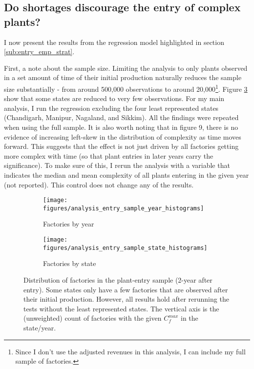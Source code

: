 \documentclass[11pt]{article}
\begin{document}
\newpage
\subsection{Do shortages discourage the entry of complex plants?}
\label{sub:longterm}
I now present the results from the regression model highlighted in section \ref{sub:entry_emp_strat}.

First, a note about the sample size. Limiting the analysis to only plants observed in a set amount of time of their initial production naturally reduces the sample size substantially - from around 500,000 observations to around 20,000\footnote{Since I don't use the adjusted revenues in this analysis, I can include my full sample of factories.}. Figure \ref{fig:new_entry_sample} show that some states are reduced to very few observations. For my main analysis, I run the regression excluding the four least represented states (Chandigarh, Manipur, Nagaland, and Sikkim). All the  findings were repeated when using the full sample. It is also worth noting that in figure 9, there is no evidence of increasing left-skew in the distribution of complexity as time moves forward. This suggests that the effect is not just driven by all factories getting more complex with time (so that plant entries in later years carry the significance). To make sure of this, I rerun the analysis with a variable that indicates the median and mean complexity of all plants entering in the given year (not reported). This control does not change any of the results.

\begin{figure}
     \centering
     \begin{subfigure}[b]{0.45\textwidth}
         \centering
         \texttt{[image: figures/analysis\_entry\_sample\_year\_histograms]}
	 \caption{Factories by year}
         \label{fig:entry_by_year}
     \end{subfigure}
     \hfill
     \begin{subfigure}[b]{0.45\textwidth}
         \centering
         \texttt{[image: figures/analysis\_entry\_sample\_state\_histograms]}
	 \caption{Factories by state}
         \label{fig:entry_by_state}
     \end{subfigure}
     \caption[Distribution of new factories by state and year]{Distribution of factories in the plant-entry sample (2-year after entry). Some states only have a few factories that are observed after their initial production. However, all results hold after rerunning the tests without the least represented states. The vertical axis is the (unweighted) count of factories with the given $C^{max}_{f}$ in the state/year.}
        \label{fig:new_entry_sample}
\end{figure}
\end{document}
